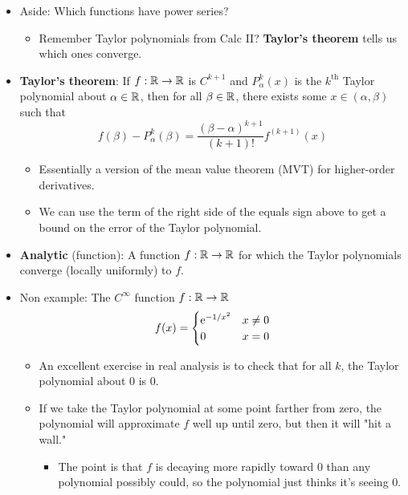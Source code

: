 \documentclass[../notes.tex]{subfiles}
\begin{document}
\begin{itemize}
    \item Aside: Which functions have power series?
    \begin{itemize}
        \item Remember Taylor polynomials from Calc II? \textbf{Taylor's theorem} tells us which ones converge.
    \end{itemize}
    \item \textbf{Taylor's theorem}: If $f:\R\to\R$ is $C^{k+1}$ and $P_\alpha^k(x)$ is the $k^\text{th}$ Taylor polynomial about $\alpha\in\R$, then for all $\beta\in\R$, there exists some $x\in(\alpha,\beta)$ such that
    \begin{equation*}
        f(\beta)-P_\alpha^k(\beta) = \frac{(\beta-\alpha)^{k+1}}{(k+1)!}f^{(k+1)}(x)
    \end{equation*}
    \begin{itemize}
        \item Essentially a version of the mean value theorem (MVT) for higher-order derivatives.
        \item We can use the term of the right side of the equals sign above to get a bound on the error of the Taylor polynomial.
    \end{itemize}
    \item \textbf{Analytic} (function): A function $f:\R\to\R$ for which the Taylor polynomials converge (locally uniformly) to $f$.
    \item Non example: The $C^\infty$ function $f:\R\to\R$
    \begin{equation*}
        f(x) =
        \begin{cases}
            \e[-1/x^2] & x\neq 0\\
            0 & x=0
        \end{cases}
    \end{equation*}
    \begin{itemize}
        \item An excellent exercise in real analysis is to check that for all $k$, the Taylor polynomial about 0 is 0.
        \item If we take the Taylor polynomial at some point farther from zero, the polynomial will approximate $f$ well up until zero, but then it will "hit a wall."
        \begin{itemize}
            \item The point is that $f$ is decaying more rapidly toward 0 than any polynomial possibly could, so the polynomial just thinks it's seeing 0.
        \end{itemize}

\end{itemize}
\end{itemize}
\end{document}

